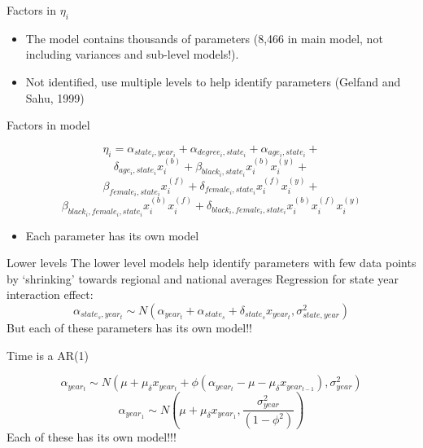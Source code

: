 \documentclass{beamer}
\begin{document}
	\begin{frame}{Factors in $ \eta_i $}

		\begin{itemize}
			\item The model contains thousands of parameters (8,466 in main model, not including variances and sub-level models!). 
			\item Not identified, use multiple levels to help identify parameters (Gelfand and Sahu, 1999)
		\end{itemize}
		\begin{description}
			\item[Factors in model] 
		\end{description}
			 $$ \eta_i = \alpha_{state_i, year_i} + \alpha_{degree_i, state_i} + \alpha_{age_i, state_i} +  $$
			 $$ \delta_{age_i, state_i}x^{(b)}_i + \beta_{black_i, state_i}x^{(b)}_ix^{(y)}_i  + $$
			 $$ \beta_{female_i, state_i} x^{(f)}_i +  \delta_{female_i, state_i}x^{(f)}_ix^{(y)}_i  + $$ 
		$$ \beta_{black_i, female_i, state_i}x^{(b)}_ix^{(f)}_i + \delta_{black_i, female_i, state_i}x^{(b)}_ix^{(f)}_ix^{(y)}_i $$
			\begin{itemize}
				\item Each parameter has its own model
			\end{itemize}
	\end{frame}

	\begin{frame}{Lower levels}
		The lower level models help identify parameters with few data points by `shrinking' towards regional and national averages
		Regression for state year interaction effect:
		\begin{equation}
		\alpha_{state_s,year_t} \sim N(\alpha_{year_t} + \alpha_{state_s} + \delta_{state_s}x_{year_t}, \sigma^2_{state, year})
		\end{equation}
		But each of these parameters has its own model!! \\ \begin{center} Time is a AR(1) \end{center}
		\begin{equation}
		\alpha_{year_t} \sim N(\mu + \mu_{\delta}x_{year_t} + \phi(\alpha_{year_t}  - \mu - \mu_{\delta} x_{year_{t-1}}), \sigma^2_{year})
		\end{equation}
		\begin{equation}
		\alpha_{year_1} \sim N(\mu + \mu_{\delta} x_{year_1}, \frac{\sigma^2_{year}}{(1-\phi^2)}  ) 
		\end{equation}
		Each of these has its own model!!!
	\end{frame}
	
\end{document}
